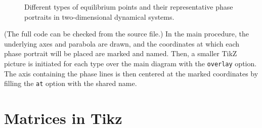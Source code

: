 \begin{figure}
    \caption{Different types of equilibrium points and their representative phase portraits in two-dimensional dynamical systems.}
    \label{fig:phasediagram}
\end{figure}
(The full code can be checked from the source file.) In the main procedure, the underlying axes and parabola are drawn, and the coordinates at which each phase portrait will be placed are marked and named. Then, a smaller TikZ picture is initiated for each type over the main diagram with the \texttt{overlay} option. The axis containing the phase lines is then centered at the marked coordinates by filling the \texttt{at} option with the shared name.

\section{Matrices in Tikz}

